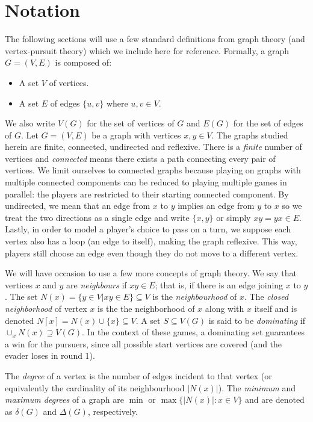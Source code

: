 \section{Notation}

The following sections will use a few standard definitions from graph theory (and vertex-pursuit theory) which we include here for reference.
Formally, a graph $G = (V, E)$ is composed of:

\begin{itemize}
\item A set $V$ of vertices.
\item A set $E$ of edges $\{u,v\}$ where $u, v \in V$.
\end{itemize}

We also write $V(G)$ for the set of vertices of $G$ and $E(G)$ for the set of edges of $G$.
Let $G = (V,E)$ be a graph with vertices $x,y \in V$.
The graphs studied herein are finite, connected, undirected and reflexive.
There is a \textit{finite} number of vertices and \textit{connected} means there exists a path connecting every pair of vertices.
We limit ourselves to connected graphs because playing on graphs with multiple connected components can be reduced to playing multiple games in parallel: the players are restricted to their starting connected component. By undirected, we mean that an edge from $x$ to $y$ implies an edge from $y$ to $x$ so we treat the two directions as a single edge and write $\{x,y\}$ or simply $xy = yx \in E$.
Lastly, in order to model a player's choice to pass on a turn, we suppose each vertex also has a loop (an edge to itself), making the graph reflexive. This way, players still choose an edge even though they do not move to a different vertex.

We will have occasion to use a few more concepts of graph theory. We say that vertices $x$ and $y$ are \textit{neighbours} if $xy \in E$; that is, if there is an edge joining $x$ to $y$.
The set $N(x) = \{ y \in V | xy \in E \} \subseteq V$ is the \textit{neighbourhood} of $x$.
The \textit{closed neighborhood} of vertex $x$ is the the neighborhood of $x$ along with $x$ itself and is denoted $N[x] = N(x) \cup \{x\} \subseteq V$. A set $S \subseteq V(G)$ is said to be \textit{dominating} if $\cup_x N(x) \supseteq V(G)$. In the context of these games, a dominating set guarantees a win for the pursuers, since all possible start vertices are covered (and the evader loses in round 1).

The \textit{degree} of a vertex is the number of edges incident to that vertex (or equivalently the
cardinality of its neighbourhood $\lvert N(x) \rvert$). The \textit{minimum} and \textit{maximum
degrees} of a graph are $\min \text{ or } \max \{ \lvert N(x)\rvert : x \in V\}$ and are denoted as $\delta(G)$ and $\Delta(G)$, respectively.

